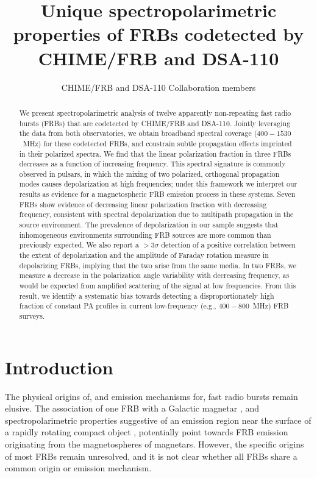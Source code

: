 \documentclass[twocolumn, linenumbers]{aastex701}
\begin{document}
\title{Unique spectropolarimetric properties of FRBs codetected by CHIME/FRB and DSA-110}

\author{CHIME/FRB and DSA-110 Collaboration members}
\affiliation{ }
\email{ }


\begin{abstract}
We present spectropolarimetric analysis of twelve apparently non-repeating fast radio bursts (FRBs) that are codetected by CHIME/FRB and DSA-110. Jointly leveraging the data from both observatories, we obtain broadband spectral coverage ($400-1530$~MHz) for these codetected FRBs, and constrain subtle propagation effects imprinted in their polarized spectra. We find that the linear polarization fraction in three FRBs decreases as a function of increasing frequency. This spectral signature is commonly observed in pulsars, in which the mixing of two polarized, orthogonal propagation modes causes depolarization at high frequencies; under this framework we interpret our results as evidence for a magnetospheric FRB emission process in these systems. Seven FRBs show evidence of decreasing linear polarization fraction with decreasing frequency, consistent with spectral depolarization due to multipath propagation in the source environment. The prevalence of depolarization in our sample suggests that inhomogeneous environments surrounding FRB sources are more common than previously expected. We also report a $>3\sigma$ detection of a positive correlation between the extent of depolarization and the amplitude of Faraday rotation measure in depolarizing FRBs, implying that the two arise from the same media. In two FRBs, we measure a decrease in the polarization angle variability with decreasing frequency, as would be expected from amplified scattering of the signal at low frequencies. From this result, we identify a systematic bias towards detecting a disproportionately high fraction of constant PA profiles in current low-frequency (e.g., $400-800$~MHz) FRB surveys.
\end{abstract}



\section{Introduction} \label{sec:intro}
The physical origins of, and emission mechanisms for, fast radio bursts \citep[FRBs; micro- to millisecond duration, coherent radio transients, mostly from extragalactic distances][]{2007Sci...318..777L} remain elusive. The association of one FRB with a Galactic magnetar \citep[FRB~200428;][]{2020Natur.587...54C, 2020Natur.587...59B}, and spectropolarimetric properties suggestive of an emission region near the surface of a rapidly rotating compact object \citep[FRB~20221022A;][]{2025Natur.637...43M, 2025Natur.637...48N}, potentially point towards FRB emission originating from the magnetospheres of magnetars. However, the specific origins of most FRBs \citep[i.e., over 4500;][]{FRBCollaboration_2026_arXiv} remain unresolved, and it is not clear whether all FRBs share a common origin or emission mechanism.
\end{document}
